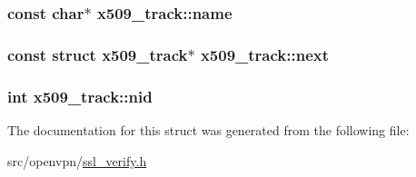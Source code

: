 \subsubsection[{name}]{\setlength{\rightskip}{0pt plus 5cm}const char$\ast$ x509\+\_\+track\+::name}\label{structx509__track_afe6b5788f3d6f2e75c1d64a37adabad4}
\hypertarget{structx509__track_afc549262d7d58cf8df785fe0c26c4f48}{}
\subsubsection[{next}]{\setlength{\rightskip}{0pt plus 5cm}const struct {\bf x509\+\_\+track}$\ast$ x509\+\_\+track\+::next}\label{structx509__track_afc549262d7d58cf8df785fe0c26c4f48}
\hypertarget{structx509__track_a2e1d7f7c62d481be8c5b77c59025043b}{}
\subsubsection[{nid}]{\setlength{\rightskip}{0pt plus 5cm}int x509\+\_\+track\+::nid}\label{structx509__track_a2e1d7f7c62d481be8c5b77c59025043b}


The documentation for this struct was generated from the following file\+:\begin{DoxyCompactItemize}
\item 
src/openvpn/\hyperlink{ssl__verify_8h}{ssl\+\_\+verify.\+h}\end{DoxyCompactItemize}
